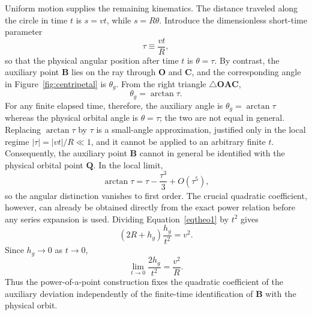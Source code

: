 \documentclass[preprint,12pt,3p,nopreprintline]{elsarticle}
\newcommand{\pt}[1]{\mathbf{#1}}
\newcommand{\be}{\begin{equation}}
\newcommand{\ee}{\end{equation}}
\numberwithin{equation}{section}
\theoremstyle{remark}
\begin{document}
Uniform motion supplies the remaining kinematics. The distance traveled along the circle in time $t$ is $s=vt$, while $s=R\theta$. Introduce the dimensionless short-time parameter
\be
\tau\equiv\frac{vt}{R},
\label{eq:tau}
\ee
so that the physical angular position after time $t$ is $\theta=\tau$. By contrast, the auxiliary point $\pt{B}$ lies on the ray through $\pt{O}$ and $\pt{C}$, and the corresponding angle in Figure~\ref{fig:centripetal} is $\theta_g$. From the right triangle $\triangle \mathbf{OAC}$,
\be
\theta_g=\arctan\tau.
\label{eq:theta-g}
\ee
For any finite elapsed time, therefore, the auxiliary angle is $\theta_g=\arctan\tau$ whereas the physical orbital angle is $\theta=\tau$; the two are not equal in general. Replacing $\arctan\tau$ by $\tau$ is a small-angle approximation, justified only in the local regime $|\tau|=|vt|/R\ll1$, and it cannot be applied to an arbitrary finite $t$. Consequently, the auxiliary point $\pt{B}$ cannot in general be identified with the physical orbital point $\pt{Q}$. In the local limit,
\be
\arctan\tau=\tau-\frac{\tau^3}{3}+O(\tau^5),
\ee
so the angular distinction vanishes to first order. The crucial quadratic coefficient, however, can already be obtained directly from the exact power relation before any series expansion is used. Dividing Equation~\eqref{eqtheo1} by $t^2$ gives
\be
\left(2R+h_g\right)\frac{h_g}{t^2}=v^2.
\ee
Since $h_g\to0$ as $t\to0$,
\be
\lim_{t\to0}\frac{2h_g}{t^2}=\frac{v^2}{R}.
\label{eq:hg-limit}
\ee
Thus the power-of-a-point construction fixes the quadratic coefficient of the auxiliary deviation independently of the finite-time identification of $\pt{B}$ with the physical orbit.
\end{document}
